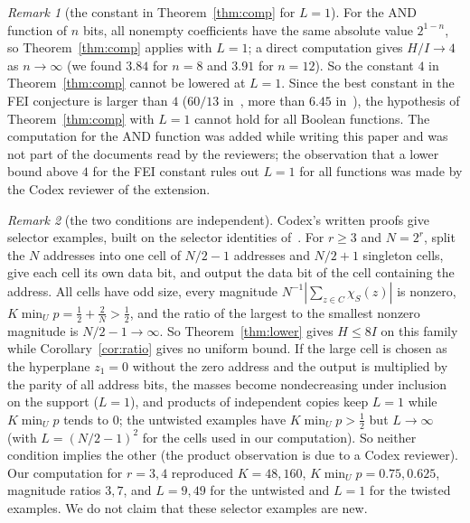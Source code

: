 \documentclass[11pt]{article}
\theoremstyle{definition}
\theoremstyle{remark}
\newtheorem{remark}{Remark}
\begin{document}
\begin{remark}[the constant in Theorem~\ref{thm:comp} for $L=1$]\label{rem:and}
For the AND function of $n$ bits, all nonempty coefficients have the same
absolute value $2^{1-n}$, so Theorem~\ref{thm:comp} applies with $L=1$; a direct
computation gives $H/I\to4$ as $n\to\infty$ (we found $3.84$ for $n=8$ and $3.91$
for $n=12$). So the constant $4$ in Theorem~\ref{thm:comp} cannot be lowered at
$L=1$. Since the best constant in the FEI conjecture is
larger than $4$ ($60/13$ in~\cite[Section~1]{owz}, more than $6.45$
in~\cite{hod}), the hypothesis of Theorem~\ref{thm:comp} with
$L=1$ cannot hold for all Boolean functions. The computation for the AND
function was added while writing this paper and was not part of the documents
read by the reviewers; the observation that a lower bound above $4$ for the FEI
constant rules out $L=1$ for all functions was made by the Codex reviewer of
the extension.
\end{remark}

\begin{remark}[the two conditions are independent]\label{rem:selectors}
Codex's written proofs give selector examples, built on the selector identities
of~\cite[Section~8]{shm}. For $r\ge3$ and $N=2^r$, split the $N$ addresses into
one cell of $N/2-1$ addresses and $N/2+1$ singleton cells, give each cell its
own data bit, and output the data bit of the cell containing the address. All
cells have odd size, every magnitude $N^{-1}|\sum_{z\in C}\chi_S(z)|$ is
nonzero, $K\min_Up=\frac12+\frac2N>\frac12$, and the ratio of the largest to
the smallest nonzero magnitude is $N/2-1\to\infty$. So
Theorem~\ref{thm:lower} gives $H\le8I$ on this family while
Corollary~\ref{cor:ratio} gives no uniform bound. If the large cell is chosen as
the hyperplane $z_1=0$ without the zero address and the output is multiplied by
the parity of all address bits, the masses become nondecreasing under inclusion
on the support ($L=1$), and products of independent copies keep $L=1$ while
$K\min_Up$ tends to $0$; the untwisted examples have $K\min_Up>\frac12$ but
$L\to\infty$ (with $L=(N/2-1)^2$ for the cells used in our computation). So
neither condition implies the other (the product
observation is due to a Codex reviewer). Our computation for $r=3,4$
reproduced $K=48,160$, $K\min_Up=0.75,0.625$, magnitude ratios $3,7$, and
$L=9,49$ for the untwisted and $L=1$ for the twisted examples. We do not claim
that these selector examples are new.
\end{remark}
\end{document}
